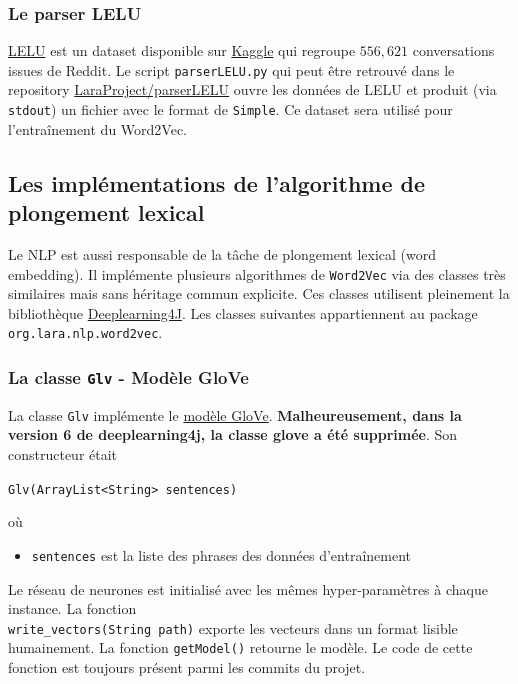 \documentclass[10pt,a4paper]{article}
\newcommand\tab[1][0.5cm]{\hspace*{#1}}
\begin{document}
\subsubsection{Le parser LELU}
\href{https://www.kaggle.com/breandan/french-reddit-discussion}{LELU} est un dataset disponible sur \href{https://www.kaggle.com/breandan/french-reddit-discussion}{Kaggle} qui regroupe $556,621$ conversations issues de Reddit. Le script \texttt{parserLELU.py} qui peut être retrouvé dans le repository \href{https://github.com/LaraProject/parserLELU}{LaraProject/parserLELU} ouvre les données de LELU et produit (via \texttt{stdout}) un fichier avec le format de \texttt{Simple}. Ce dataset sera utilisé pour l'entraînement du Word2Vec.

\subsection{Les implémentations de l'algorithme de plongement lexical}
Le NLP est aussi responsable de la tâche de plongement lexical (word embedding). Il implémente plusieurs algorithmes de \texttt{Word2Vec} via des classes très similaires mais sans héritage commun explicite. Ces classes utilisent pleinement la bibliothèque \href{https://deeplearning4j.konduit.ai/}{Deeplearning4J}. Les classes suivantes appartiennent au package \texttt{org.lara.nlp.word2vec}.

\subsubsection{La classe \texttt{Glv} - Modèle GloVe}
La classe \texttt{Glv} implémente le \href{https://en.wikipedia.org/wiki/GloVe_(machine_learning)}{modèle GloVe}. \textbf{Malheureusement, dans la version 6 de deeplearning4j, la classe glove a été supprimée}. Son constructeur était
\begin{center}
	\texttt{Glv(ArrayList<String> sentences)}
\end{center}
où
\begin{itemize}
	\item \texttt{sentences} est la liste des phrases des données d'entraînement
\end{itemize}
\tab Le réseau de neurones est initialisé avec les mêmes hyper-paramètres à chaque instance. La fonction \\
\noindent \texttt{write\_vectors(String path)} exporte les vecteurs dans un format lisible humainement. La fonction \texttt{getModel()} retourne le modèle. Le code de cette fonction est toujours présent parmi les commits du projet.
\end{document}
